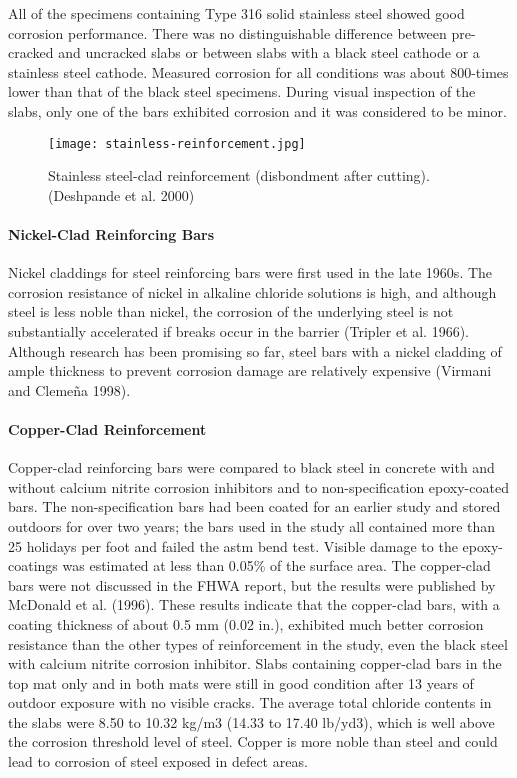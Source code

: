 All of the specimens containing Type 316 solid stainless steel showed good corrosion performance. There was
no distinguishable difference between pre-cracked and uncracked slabs or between slabs with a black steel cathode or
a stainless steel cathode. Measured corrosion for all conditions was about 800-times lower than that of the black
steel specimens. During visual inspection of the slabs, only one of the bars exhibited corrosion and it was considered
to be minor.

\begin{figure}
  \texttt{[image: stainless-reinforcement.jpg]}
  \caption{Stainless steel-clad reinforcement (disbondment after cutting). (Deshpande et al. 2000)}
  \label{fig:stainless-reinforcement}
\end{figure}

\paragraph{Nickel-Clad Reinforcing Bars}
Nickel claddings for steel reinforcing bars were first used in the late 1960s. The corrosion resistance of nickel in alkaline chloride solutions is high, and although steel is less noble than nickel, the corrosion of the underlying steel is not substantially accelerated if breaks occur in the barrier (Tripler et al. 1966). Although research has been promising so far, steel bars with a nickel cladding of ample thickness to prevent corrosion damage are relatively expensive (Virmani and Clemeña 1998).


\paragraph{Copper-Clad Reinforcement}
Copper-clad reinforcing bars were compared to black steel in concrete with and without calcium nitrite corrosion inhibitors and to non-specification epoxy-coated bars. The non-specification bars had been coated for an earlier study and stored outdoors for over two years; the bars used in the study all contained more than 25 holidays per foot and failed the \acrshort*{astm} bend test. Visible damage to the epoxy-coatings was estimated at less than 0.05\% of the surface area. The copper-clad bars were not discussed in the FHWA report, but the results were published by McDonald et al. (1996). These results indicate that the copper-clad bars, with a coating thickness of about 0.5 mm (0.02 in.), exhibited much better corrosion resistance than the other types of reinforcement in the study, even the black steel with calcium nitrite corrosion inhibitor. Slabs containing copper-clad bars in the top mat only and in both mats were still in good condition after 13 years of outdoor exposure with no visible cracks. The average total chloride contents in the slabs were 8.50 to 10.32 kg/m3 (14.33 to 17.40 lb/yd3), which is well above the corrosion threshold level of steel. Copper is more noble than steel and could lead to corrosion of steel exposed in defect areas.

